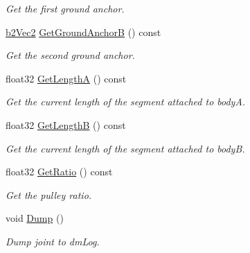 \begin{DoxyCompactItemize}
\begin{DoxyCompactList}\small\item\em Get the first ground anchor. \end{DoxyCompactList}\item 
\hypertarget{classb2_pulley_joint_a1b49d0dbce802f19711a9ab6d7dadfee}{\hyperlink{structb2_vec2}{b2\-Vec2} \hyperlink{classb2_pulley_joint_a1b49d0dbce802f19711a9ab6d7dadfee}{Get\-Ground\-Anchor\-B} () const }\label{classb2_pulley_joint_a1b49d0dbce802f19711a9ab6d7dadfee}

\begin{DoxyCompactList}\small\item\em Get the second ground anchor. \end{DoxyCompactList}\item 
\hypertarget{classb2_pulley_joint_a6b4c2e5cb4f5da48fcb074c7b5988084}{float32 \hyperlink{classb2_pulley_joint_a6b4c2e5cb4f5da48fcb074c7b5988084}{Get\-Length\-A} () const }\label{classb2_pulley_joint_a6b4c2e5cb4f5da48fcb074c7b5988084}

\begin{DoxyCompactList}\small\item\em Get the current length of the segment attached to body\-A. \end{DoxyCompactList}\item 
\hypertarget{classb2_pulley_joint_abc7f31a35c6fb32647fd15d57e4ce60c}{float32 \hyperlink{classb2_pulley_joint_abc7f31a35c6fb32647fd15d57e4ce60c}{Get\-Length\-B} () const }\label{classb2_pulley_joint_abc7f31a35c6fb32647fd15d57e4ce60c}

\begin{DoxyCompactList}\small\item\em Get the current length of the segment attached to body\-B. \end{DoxyCompactList}\item 
\hypertarget{classb2_pulley_joint_a625685e60d95b7c5a725e8586d146752}{float32 \hyperlink{classb2_pulley_joint_a625685e60d95b7c5a725e8586d146752}{Get\-Ratio} () const }\label{classb2_pulley_joint_a625685e60d95b7c5a725e8586d146752}

\begin{DoxyCompactList}\small\item\em Get the pulley ratio. \end{DoxyCompactList}\item 
\hypertarget{classb2_pulley_joint_ad12d0e03b5d07b2f8af1005c95c67aa2}{void \hyperlink{classb2_pulley_joint_ad12d0e03b5d07b2f8af1005c95c67aa2}{Dump} ()}\label{classb2_pulley_joint_ad12d0e03b5d07b2f8af1005c95c67aa2}

\begin{DoxyCompactList}\small\item\em Dump joint to dm\-Log. \end{DoxyCompactList}\end{DoxyCompactItemize}
